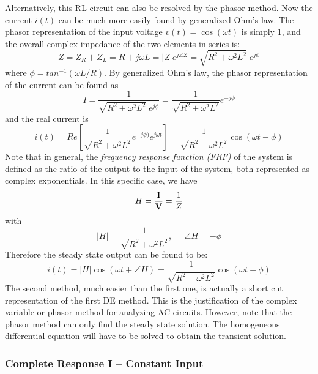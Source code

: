 \documentclass{article}
\begin{document}
Alternatively, this RL circuit can also be resolved by the phasor
method. Now the current $i(t)$ can be much more easily found by 
generalized Ohm's law. The phasor representation of the input voltage 
$v(t)=\cos(\omega t)$ is simply 1, and the overall complex impedance 
of the two elements in series is:
\begin{equation}
  Z=Z_R+Z_L=R+j\omega L=|Z| e^{j\angle Z}=\sqrt{R^2+\omega^2L^2}\;e^{j \phi} 
\end{equation}
where $\phi=tan^{-1}(\omega L/R)$. By generalized Ohm's law, 
the phasor representation of the current can be found as
\begin{equation}
  I=\frac{1}{\sqrt{R^2+\omega^2L^2}\;e^{j\phi}}
  =\frac{1}{\sqrt{R^2+\omega^2L^2}} e^{-j\phi}	
\end{equation}
and the real current is
\begin{equation}
  i(t)=Re\left[\frac{1}{\sqrt{R^2+\omega^2 L^2}}e^{-j\phi)}e^{j\omega t}\right]
  =\frac{1}{\sqrt{R^2+\omega^2 L^2}}\cos(\omega t-\phi)	
\end{equation}
Note that in general, the {\em frequency response function (FRF)} of 
the system is defined as the ratio of the output to the input of the
system, both represented as complex exponentials. In this specific case,
we have
\begin{equation}
  H=\frac{{\bf I}}{{\bf V}}=\frac{1}{Z} 
\end{equation}
with 
\begin{equation}
  |H|=\frac{1}{\sqrt{R^2+\omega^2L^2}},\;\;\;\;\;\angle H=-\phi 
\end{equation}
Therefore the steady state output can be found to be:
\begin{equation}
  i(t)=|H| \cos(\omega t+\angle H)
  =\frac{1}{\sqrt{R^2+\omega^2 L^2}}\cos(\omega t-\phi)	
\end{equation}
The second method, much easier than the first one, is actually a short 
cut representation of the first DE method. This is the justification of
the complex variable or phasor method for analyzing AC circuits. However,
note that the phasor method can only find the steady state solution. The
homogeneous differential equation will have to be solved to obtain the
transient solution.



\subsubsection*{Complete Response I -- Constant Input}
\end{document}
